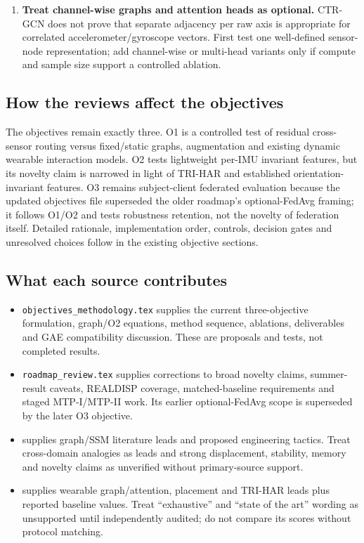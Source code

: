 \documentclass[10pt,a4paper]{article}
\begin{document}
\begin{enumerate}
\item \textbf{Treat channel-wise graphs and attention heads as optional.} CTR-GCN does not prove that separate adjacency per raw axis is appropriate for correlated accelerometer/gyroscope vectors. First test one well-defined sensor-node representation; add channel-wise or multi-head variants only if compute and sample size support a controlled ablation.
\end{enumerate}

\subsection{How the reviews affect the objectives}
The objectives remain exactly three. O1 is a controlled test of residual cross-sensor routing versus fixed/static graphs, augmentation and existing dynamic wearable interaction models. O2 tests lightweight per-IMU invariant features, but its novelty claim is narrowed in light of TRI-HAR and established orientation-invariant features. O3 remains subject-client federated evaluation because the updated objectives file superseded the older roadmap's optional-FedAvg framing; it follows O1/O2 and tests robustness retention, not the novelty of federation itself. Detailed rationale, implementation order, controls, decision gates and unresolved choices follow in the existing objective sections.

\subsection{What each source contributes}
\begin{itemize}
\item \texttt{objectives\_methodology.tex} supplies the current three-objective formulation, graph/O2 equations, method sequence, ablations, deliverables and GAE compatibility discussion. These are proposals and tests, not completed results.
\item \texttt{roadmap\_review.tex} supplies corrections to broad novelty claims, summer-result caveats, REALDISP coverage, matched-baseline requirements and staged MTP-I/MTP-II work. Its earlier optional-FedAvg scope is superseded by the later O3 objective.
\item {} supplies graph/SSM literature leads and proposed engineering tactics. Treat cross-domain analogies as leads and strong displacement, stability, memory and novelty claims as unverified without primary-source support.
\item {} supplies wearable graph/attention, placement and TRI-HAR leads plus reported baseline values. Treat ``exhaustive'' and ``state of the art'' wording as unsupported until independently audited; do not compare its scores without protocol matching.
\end{itemize}
\end{document}
